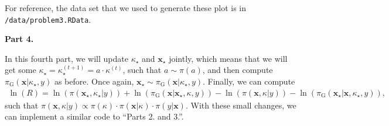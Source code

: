 \documentclass[12pt]{article}\usepackage[]{graphicx}\usepackage[]{color}
\begin{document}
For reference, the data set that we used to generate these plot is in \texttt{/data/problem3.RData}.

\newpage

\textbf{Part 4.}

In this fourth part, we will update $\kappa_{\star}$ and $\boldsymbol{x}_{\star}$ jointly, which means that we will get some $\kappa_{\star} = \kappa^{(t+1)}_{\star} = a \cdot \kappa^{(t)}$, such that $a \sim \pi(a)$, and then compute $\pi_{\text{G}}(\boldsymbol{x}|\kappa_{\star}, y)$ as before. Once again, $\boldsymbol{x}_{\star} \sim \pi_{\text{G}}(\boldsymbol{x}|\kappa_{\star}, y)$. Finally, we can compute
\begin{align*}
\ln(R) =  \ln(\pi({\boldsymbol{x}}_{\star}, \kappa_{\star} | y)) +  \ln(\pi_{\text{G}}(\boldsymbol{x} | \boldsymbol{x}_{\star}, \kappa, y)) - \ln(\pi(\boldsymbol{x}, \kappa | y)) - \ln(\pi_{\text{G}}({\boldsymbol{x}}_{\star} | \boldsymbol{x}, \kappa_{\star}, y)),
\end{align*}
such that $\pi(\boldsymbol{x}, \kappa | y) \propto \pi(\kappa) \cdot \pi(\boldsymbol{x}|\kappa) \cdot \pi(y | \boldsymbol{x})$. With these small changes, we can implement a similar code to ``Parts 2. and 3.''.
\end{document}
